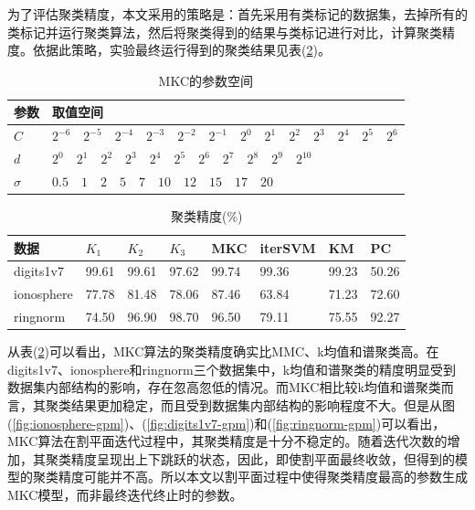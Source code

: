为了评估聚类精度，本文采用的策略是：首先采用有类标记的数据集，去掉所有的类标记并运行聚类算法，然后将聚类得到的结果与类标记进行对比，计算聚类精度。依据此策略，实验最终运行得到的聚类结果见表(\ref{tab:result})。
\begin{table}[!htbp]
\caption{MKC的参数空间}
\centering
\small
\renewcommand\arraystretch{1.5}
\begin{tabular}{p{1.5cm}<{\centering}|p{12cm}}
\hline
参数 & \hspace{0.5cm}取值空间\\
\hline
$C$ &  \hspace{0.5cm}$2^{-6} \quad 2^{-5} \quad 2^{-4} \quad 2^{-3} \quad 2^{-2} \quad 2^{-1} \quad 2^{0} \quad 2^{1} \quad 2^{2} \quad 2^{3} \quad 2^{4} \quad 2^{5} \quad 2^{6} $\\
\hline
$d$ &  \hspace{0.5cm}$2^{0} \quad 2^{1} \quad 2^{2} \quad 2^{3} \quad 2^{4} \quad 2^{5} \quad 2^{6} \quad 2^{7} \quad 2^{8} \quad 2^{9} \quad 2^{10}$ \\
\hline
$\sigma$ &  \hspace{0.5cm}$0.5 \quad 1 \quad 2 \quad 5 \quad 7 \quad 10 \quad 12 \quad 15 \quad 17 \quad 20 $\\
\hline
\end{tabular}
\label{tab:para}
\end{table} 

\begin{table}[!htbp]
\caption{聚类精度(\%)}
\centering
\small
\renewcommand\arraystretch{1.5}
\begin{tabular}{|p{2cm}<{\centering}|p{1.3cm}<{\centering}|p{1.3cm}<{\centering}|p{1.3cm}<{\centering}|p{1.3cm}<{\centering}|p{1.3cm}<{\centering}|p{1.3cm}<{\centering}|p{1.3cm}<{\centering}|}
\hline
数据 & $K_1$ & $K_2$ & $K_3$ & MKC & iterSVM & KM & PC \\
\hline
digits1v7 & 99.61 & 99.61 & 97.62 & 99.74 & 99.36 & 99.23 & 50.26 \\
\hline
ionosphere & 77.78 & 81.48 & 78.06 & 87.46 & 63.84 & 71.23 & 72.60 \\
\hline
ringnorm & 74.50 & 96.90 & 98.70 & 96.50 & 79.11 & 75.55 & 92.27 \\
\hline
\end{tabular}
\label{tab:result}
\end{table}

从表(\ref{tab:result})可以看出，MKC算法的聚类精度确实比MMC、k均值和谱聚类高。在digits1v7、ionosphere和ringnorm三个数据集中，k均值和谱聚类的精度明显受到数据集内部结构的影响，存在忽高忽低的情况。而MKC相比较k均值和谱聚类而言，其聚类结果更加稳定，而且受到数据集内部结构的影响程度不大。但是从图(\ref{fig:ionosphere-gpm})、(\ref{fig:digits1v7-gpm})和(\ref{fig:ringnorm-gpm})可以看出，MKC算法在割平面迭代过程中，其聚类精度是十分不稳定的。随着迭代次数的增加，其聚类精度呈现出上下跳跃的状态，因此，即使割平面最终收敛，但得到的模型的聚类精度可能并不高。所以本文以割平面过程中使得聚类精度最高的参数生成MKC模型，而非最终迭代终止时的参数。

